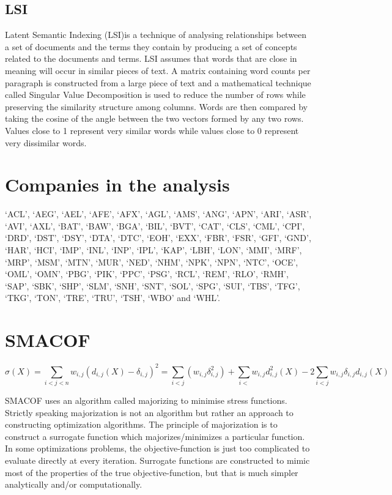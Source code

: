 \documentclass[11pt]{article}
\begin{document}
\hypertarget{lsi}{%
\subsection{LSI}\label{lsi}}

Latent Semantic Indexing (LSI)is a technique of analysing relationships
between a set of documents and the terms they contain by producing a set
of concepts related to the documents and terms. LSI assumes that words
that are close in meaning will occur in similar pieces of text. A matrix
containing word counts per paragraph is constructed from a large piece
of text and a mathematical technique called Singular Value Decomposition
is used to reduce the number of rows while preserving the similarity
structure among columns. Words are then compared by taking the cosine of
the angle between the two vectors formed by any two rows. Values close
to 1 represent very similar words while values close to 0 represent very
dissimilar words.

\hypertarget{companies-in-the-analysis}{%
\section{Companies in the analysis}\label{companies-in-the-analysis}}

`ACL', `AEG', `AEL', `AFE', `AFX', `AGL', `AMS', `ANG', `APN', `ARI',
`ASR', `AVI', `AXL', `BAT', `BAW', `BGA', `BIL', `BVT', `CAT', `CLS',
`CML', `CPI', `DRD', `DST', `DSY', `DTA', `DTC', `EOH', `EXX', `FBR',
`FSR', `GFI', `GND', `HAR', `HCI', `IMP', `INL', `INP', `IPL', `KAP',
`LBH', `LON', `MMI', `MRF', `MRP', `MSM', `MTN', `MUR', `NED', `NHM',
`NPK', `NPN', `NTC', `OCE', `OML', `OMN', `PBG', `PIK', `PPC', `PSG',
`RCL', `REM', `RLO', `RMH', `SAP', `SBK', `SHP', `SLM', `SNH', `SNT',
`SOL', `SPG', `SUI', `TBS', `TFG', `TKG', `TON', `TRE', `TRU', `TSH',
`WBO' and `WHL'.

\hypertarget{smacof}{%
\section{SMACOF}\label{smacof}}

\[\sigma(X) = \sum_{i<j<n} w_{i,j} (d_{i,j}(X)-\delta_{i,j})^2 =\sum_{i<j}(w_{i,j} \delta_{i,j}^2) + \sum_{i<}w_{i,j} d_{i,j}^2 (X) - 2 \sum_{i<j}w_{i,j} \delta_{i,j} d_{i,j}(X)\]

SMACOF uses an algorithm called majorizing to minimise stress functions.
Strictly speaking majorization is not an algorithm but rather an
approach to constructing optimization algorithms. The principle of
majorization is to construct a surrogate function which
majorizes/minimizes a particular function. In some optimizations
problems, the objective-function is just too complicated to evaluate
directly at every iteration. Surrogate functions are constructed to
mimic most of the properties of the true objective-function, but that is
much simpler analytically and/or computationally.
\end{document}
